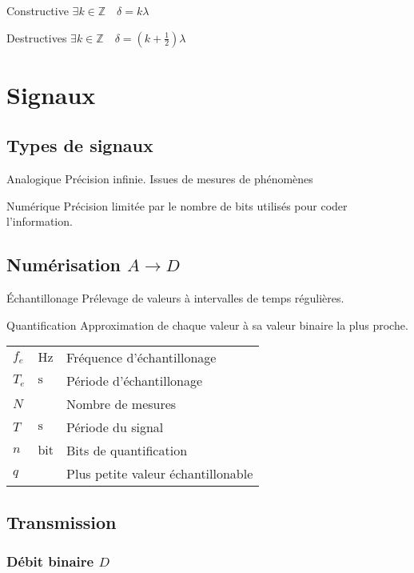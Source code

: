 \documentclass{article}
\newcommand{\bit}{\text{bit}}
\newenvironment{definitions}{\begin{description}[leftmargin=!,labelwidth=\widthof{\bfseries Lorem ipsum dolor}]}{\end{description}}
\newcommand{\deftable}[2]{%
\begin{table}[h]
    \centering
    \begin{tabular}{llp{100mm}}%
        #1
    \end{tabular}
    \label{tab:#2_units}
\end{table}%
}
\newcommand{\deftablevar}[3]{%
    $#1$ & $\si{#2}$ & #3 \\
}
\begin{document}
\begin{definitions}
\item[Constructive] $\exists k \in \mathds{Z}\quad \delta = k \lambda$
\item[Destructives] $\exists k \in \mathds{Z}\quad \delta = \left(k + \frac{1}{2}\right) \lambda$
\end{definitions}

\newpage
\section{Signaux}

\subsection{Types de signaux}

\begin{definitions}
\item[Analogique] Précision infinie. Issues de mesures de phénomènes
\item[Numérique] Précision limitée par le nombre de bits utilisés pour coder l'information.
\end{definitions}

\subsection{Numérisation $A \to D$}

\begin{definitions}
\item[Échantillonage] Prélevage de valeurs à intervalles de temps régulières.
\item[Quantification] Approximation de chaque valeur à sa valeur binaire la plus proche.
\end{definitions}

\deftable{
    \deftablevar{f_e}{\hertz}{Fréquence d'échantillonage}
    \deftablevar{T_e}{\second}{Période d'échantillonage}
    \deftablevar{N}{}{Nombre de mesures}
    \deftablevar{T}{\second}{Période du signal}
    \deftablevar{n}{\bit}{Bits de quantification}
    \deftablevar{q}{}{Plus petite valeur échantillonable}
}{echantillonage_quantification}

\subsection{Transmission}
\subsubsection{Débit binaire $D$}
\end{document}
